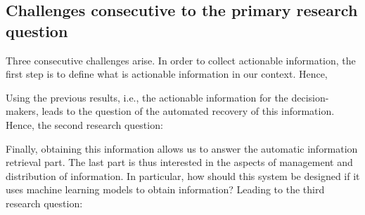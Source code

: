 \subsection{Challenges consecutive to the primary research question}
Three consecutive challenges arise.
In order to collect actionable information, the first step is to define what is actionable information in our context.
Hence,

\begin{center}
\end{center}

Using the previous results, i.e., the actionable information for the decision-makers, leads to the question of the automated recovery of this information.
Hence, the second research question:

\begin{center}
\end{center}

Finally, obtaining this information allows us to answer the automatic information retrieval part.
The last part is thus interested in the aspects of management and distribution of information.
In particular, how should this system be designed if it uses machine learning models to obtain information?
Leading to the third research question:

\begin{center}
\end{center}

